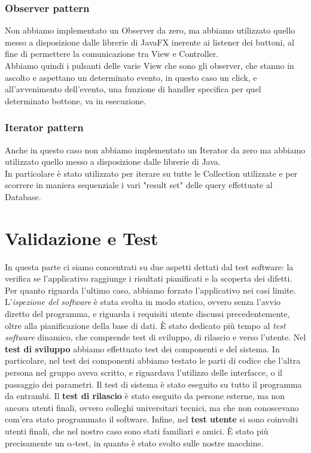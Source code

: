 \documentclass[a4paper,11pt]{report}
\begin{document}
\subsection{Observer pattern}
Non abbiamo implementato un Observer da zero, ma abbiamo utilizzato quello messo a disposizione dalle librerie di JavaFX inerente ai listener dei buttoni, al fine di permettere la comunicazione tra View e Controller.\\
Abbiamo quindi i pulsanti delle varie View che sono gli observer, che stanno in ascolto e aspettano un determinato evento, in questo caso un click, e all'avvenimento dell'evento, una funzione di handler specifica per quel determinato bottone, va in esecuzione.\\

\subsection{Iterator pattern}
Anche in questo caso non abbiamo implementato un Iterator da zero ma abbiamo utilizzato quello messo a disposizione dalle librerie di Java.\\
In particolare è stato utilizzato per iterare su tutte le Collection utilizzate e per scorrere in maniera sequenziale i vari "result set" delle query effettuate al Database.

\clearpage

\chapter{Validazione e Test}

In questa parte ci siamo concentrati su due aspetti dettati dal test software: la verifica se l'applicativo raggiunge i risultati pianificati e la scoperta dei difetti. Per quanto riguarda l'ultimo caso, abbiamo forzato l'applicativo nei casi limite. \\
L'\textit{ispezione del software} è stata svolta in modo statico, ovvero senza l'avvio diretto del programma, e riguarda i requisiti utente discussi precedentemente, oltre alla pianificazione della base di dati. È stato dedicato più tempo al \textit{test software} dinamico, che comprende test di sviluppo, di rilascio e verso l'utente.
\newline
Nel \textbf{test di sviluppo} abbiamo effettuato test dei componenti e del sistema. In particolare, nel test dei componenti abbiamo testato le parti di codice che l'altra persona nel gruppo aveva scritto, e riguardava l'utilizzo delle interfacce, o il passaggio dei parametri. Il test di sistema è stato eseguito su tutto il programma da entrambi.
\newline
Il \textbf{test di rilascio} è stato eseguito da persone esterne, ma non ancora utenti finali, ovvero colleghi universitari tecnici, ma che non conoscevano com'era stato programmato il software.
\newline
Infine, nel \textbf{test utente} si sono coinvolti utenti finali, che nel nostro caso sono stati familiari e amici. È stato più precisamente un $\alpha$-test, in quanto è stato svolto sulle nostre macchine.
\end{document}
